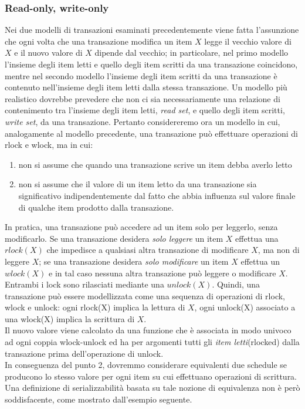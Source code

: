 \subsubsection{Read-only, write-only}
Nei due modelli di transazioni esaminati precedentemente viene fatta l'assunzione che ogni volta
che una transazione modifica un item $X$ legge il vecchio valore di $X$ e il nuovo valore di $X$ dipende
dal vecchio; in particolare, nel primo modello l'insieme degli item letti e quello degli item scritti da
una transazione coincidono, mentre nel secondo modello l'insieme degli item scritti da una
transazione è contenuto nell'insieme degli item letti dalla stessa transazione. Un modello più
realistico dovrebbe prevedere che non ci sia necessariamente una relazione di contenimento tra
l'insieme degli item letti, \emph{read set}, e quello degli item scritti, \emph{write set}, da una transazione. 
Pertanto considereremo ora un modello in cui, analogamente al modello precedente, una transazione può
effettuare operazioni di rlock e wlock, ma in cui:
\begin{enumerate}
 \item non si assume che quando una transazione scrive un item debba averlo letto
 \item non si assume che il valore di un item letto da una transazione sia significativo
indipendentemente dal fatto che abbia influenza sul valore finale di qualche item prodotto dalla
transazione.
\end{enumerate}
In pratica, una transazione può accedere ad un item solo per leggerlo, senza modificarlo. Se una transazione
desidera \emph{solo leggere} un item $X$ effettua una $rlock(X)$ che impedisce a qualsiasi altra transazione
di modificare $X$, ma non di leggere $X$; se una transazione desidera \emph{solo modificare} un item $X$ 
effettua un $wlock(X)$ e in tal caso nessuna altra transazione può leggere o modificare $X$. Entrambi i lock
sono rilasciati mediante una $unlock(X)$. Quindi, una transazione può essere modellizzata come una sequenza
di operazioni di rlock, wlock e unlock: ogni rlock(X) implica la lettura di $X$, ogni unlock(X) associato a
una wlock(X) implica la scrittura di $X$.\\
Il nuovo valore viene calcolato da una funzione che è associata in modo univoco ad ogni coppia wlock-unlock
ed ha per argomenti tutti gli \emph{item letti}(rlocked) dalla transazione prima dell'operazione di unlock.\\

In conseguenza del punto 2, dovremmo considerare equivalenti due schedule se producono lo stesso valore
per ogni item su cui effettuano operazioni di scrittura. Una definizione di serializzabilità basata su
tale nozione di equivalenza non è però soddisfacente, come mostrato dall'esempio seguente.\\

